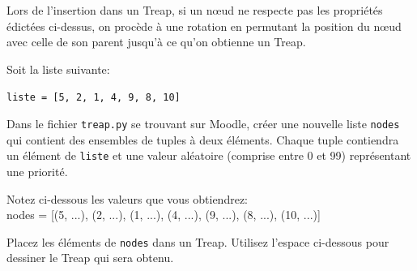 \begin{Exercice}[30 minutes]
    Lors de l'insertion dans un Treap, si un nœud ne respecte pas les propriétés édictées ci-dessus, on procède à une rotation en permutant la position du nœud avec celle de son parent jusqu'à ce qu'on obtienne un Treap.

 
    Soit la liste suivante:

    \lstinline{liste = [5, 2, 1, 4, 9, 8, 10]}

    Dans le fichier \lstinline{treap.py} se trouvant sur Moodle, créer une nouvelle liste \lstinline{nodes} qui contient des ensembles de tuples à deux éléments. Chaque tuple contiendra un élément de \lstinline{liste} et une valeur aléatoire (comprise entre 0 et 99) représentant une priorité.

    Notez ci-dessous les valeurs que vous obtiendrez:\\ 

    {\Large
    nodes = [(5, ...), (2, ...), (1, ...), (4, ...), (9, ...), (8, ...), (10, ...)]\\}

    Placez les éléments de \lstinline{nodes} dans un Treap. Utilisez l'espace ci-dessous pour dessiner le Treap qui sera obtenu.



\end{Exercice}
